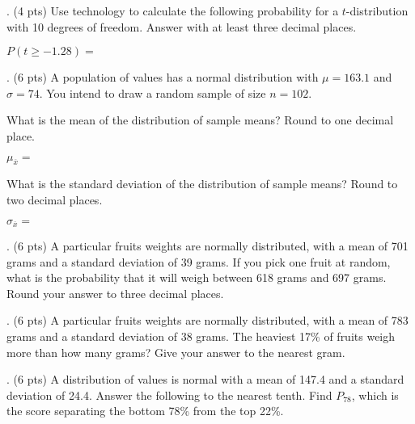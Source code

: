\documentclass{article}
\newcommand{\newquestion}{\vspace{4mm} \noindent}
\begin{document}
\pagebreak

\newquestion
5. (4 pts) Use technology to calculate the following probability for a $t$-distribution with 10 degrees of freedom. Answer with at least three decimal places. \vspace{4mm}

\(P(t \geq - 1.28) =\)
\vspace{30mm}

\newquestion
6. (6 pts) A population of values has a normal distribution with \(\mu = 163.1\) and \(\sigma = 74\). You intend to draw a random sample of size \(n = 102\).\vspace{4mm}

\hspace{4mm}What is the mean of the distribution of sample means? Round to one decimal place. \vspace{2mm}

\hspace{8mm}\(\mu_{\overline{x}} =\) \vspace{4mm}

\hspace{4mm}What is the standard deviation of the distribution of sample means? Round to two decimal places. \vspace{2mm}

\hspace{8mm}\(\sigma_{\overline{x}} =\)
\vspace{6mm}

\newquestion
7. (6 pts) A particular fruit\textquotesingle s weights are normally distributed, with a mean of 701 grams and a standard deviation of 39 grams. If you pick one fruit at random, what is the probability that it will weigh between 618 grams and 697 grams. Round your answer to three decimal places.
\vspace{35mm}

\newquestion
8. (6 pts) A particular fruit\textquotesingle s weights are normally distributed, with a mean of 783 grams and a standard deviation of 38 grams. The heaviest 17\% of fruits weigh more than how many grams? Give your answer to the nearest gram.
\vspace{35mm}

\newquestion
9. (6 pts) A distribution of values is normal with a mean of 147.4 and a standard deviation of 24.4. Answer the following to the nearest tenth. Find $P_{78}$, which is the score separating the bottom 78\% from the top 22\%.
\vspace{4mm}
\end{document}

